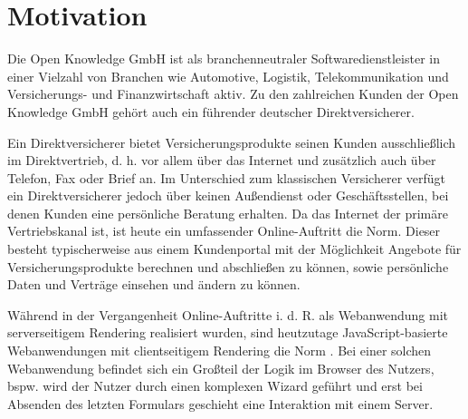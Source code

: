 
\section{Motivation}


Die Open Knowledge GmbH ist als branchenneutraler Softwaredienstleister in einer Vielzahl von Branchen wie Automotive, Logistik, Telekommunikation und Versicherungs- und Finanzwirtschaft aktiv. Zu den zahlreichen Kunden der Open Knowledge GmbH gehört auch ein führender deutscher Direktversicherer. 

Ein Direktversicherer bietet Versicherungsprodukte seinen Kunden ausschließlich im Direktvertrieb, d. h. vor allem über das Internet und zusätzlich auch über Telefon, Fax oder Brief an. Im Unterschied zum klassischen Versicherer verfügt ein Direktversicherer jedoch über keinen Außendienst oder Geschäftsstellen, bei denen Kunden eine persönliche Beratung erhalten. Da das Internet der primäre Vertriebskanal ist, ist heute ein umfassender Online-Auftritt die Norm. Dieser besteht typischerweise aus einem Kundenportal mit der Möglichkeit Angebote für Versicherungsprodukte berechnen und abschließen zu können, sowie persönliche Daten und Verträge einsehen und ändern zu können.


Während in der Vergangenheit Online-Auftritte i. d. R. als Webanwendung mit serverseitigem Rendering realisiert wurden, sind heutzutage JavaScript-basierte Webanwendungen mit clientseitigem Rendering die Norm \cite{ShiftToClientSideWebApplications}. Bei einer solchen Webanwendung befindet sich ein Großteil der Logik im Browser des Nutzers, bspw. wird der Nutzer durch einen komplexen Wizard geführt und erst bei Absenden des letzten Formulars geschieht eine Interaktion mit einem Server.

